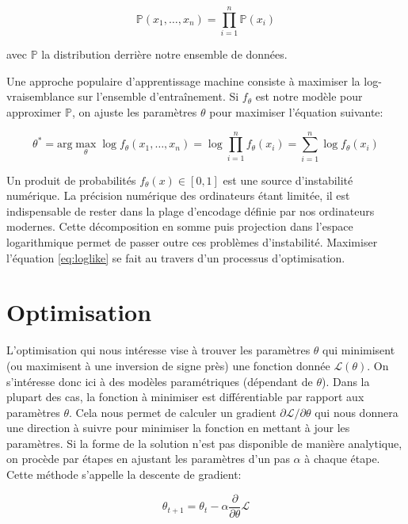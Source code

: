 \begin{equation}
\mathbb{P}(x_{1}, \dots, x_{n}) = \prod_{i=1}^{n}\mathbb{P}(x_{i})
\end{equation}

avec $\mathbb{P}$ la distribution derrière notre ensemble de données.

Une approche populaire d'apprentissage machine consiste à maximiser la
log-vraisemblance sur l'ensemble d'entraînement. 
Si $f_{\theta}$ est notre
modèle pour approximer $\mathbb{P}$, on ajuste les paramètres $\theta$ pour
maximiser l'équation suivante:

\begin{equation}
\label{eq:loglike}
\theta^{*}=\textrm{arg}\max_{\theta} \log f_{\theta}(x_{1}, \dots, x_{n}) = \log \prod_{i=1}^{n}f_{\theta}(x_{i}) = \sum_{i=1}^{n}\log f_{\theta}(x_{i})
\end{equation}

Un produit de probabilités $f_{\theta}(x)\in [0,1]$ est une source
d'instabilité numérique. La précision numérique des ordinateurs étant limitée,
il est indispensable de rester dans la plage d'encodage définie par nos
ordinateurs modernes. Cette décomposition en somme puis projection dans
l'espace logarithmique permet de passer outre ces problèmes d'instabilité.
Maximiser l'équation \ref{eq:loglike} se fait au travers d'un processus
d'optimisation. 
 
\section{Optimisation}

L'optimisation qui nous intéresse vise à trouver les paramètres $\theta$ qui
minimisent (ou maximisent à une inversion de signe près) une fonction donnée
$\mathcal{L}(\theta)$.  On s'intéresse donc ici à des modèles paramétriques
(dépendant de $\theta$). Dans la plupart des cas, la fonction à minimiser est
différentiable par rapport aux paramètres $\theta$.  Cela nous permet de
calculer un gradient $\partial \mathcal{L}/\partial\theta$ qui nous donnera une
direction à suivre pour minimiser la fonction en mettant à jour les paramètres. Si la forme de la solution n'est
pas disponible de manière analytique, on procède par étapes en ajustant les
paramètres d'un pas $\alpha$ à chaque étape. Cette méthode s'appelle la
descente de gradient:

\begin{equation}
\theta_{t+1} = \theta_{t} - \alpha \dfrac{\partial}{\partial\theta} \mathcal{L}
\end{equation}


